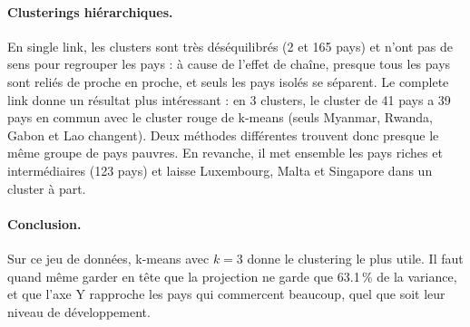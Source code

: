 \documentclass[11pt,a4paper]{article}
\renewcommand{\_}{\underscoreorig\allowbreak}
\begin{document}
\paragraph{Clusterings hiérarchiques.} En single link, les clusters sont très déséquilibrés (2 et 165 pays) et n'ont pas de sens pour regrouper les pays : à cause de l'effet de chaîne, presque tous les pays sont reliés de proche en proche, et seuls les pays isolés se séparent. Le complete link donne un résultat plus intéressant : en 3 clusters, le cluster de 41 pays a 39 pays en commun avec le cluster rouge de k-means (seuls Myanmar, Rwanda, Gabon et Lao changent). Deux méthodes différentes trouvent donc presque le même groupe de pays pauvres. En revanche, il met ensemble les pays riches et intermédiaires (123 pays) et laisse Luxembourg, Malta et Singapore dans un cluster à part.

\paragraph{Conclusion.} Sur ce jeu de données, k-means avec $k = 3$ donne le clustering le plus utile. Il faut quand même garder en tête que la projection ne garde que 63.1\,\% de la variance, et que l'axe Y rapproche les pays qui commercent beaucoup, quel que soit leur niveau de développement.
\end{document}
